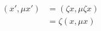 \documentclass[preview]{standalone}
\begin{document}
\begin{align*}
(x',\mu x')& =(\zeta x,\mu \zeta x)\\ & = \zeta (x, \mu x)
\end{align*}
\end{document}
